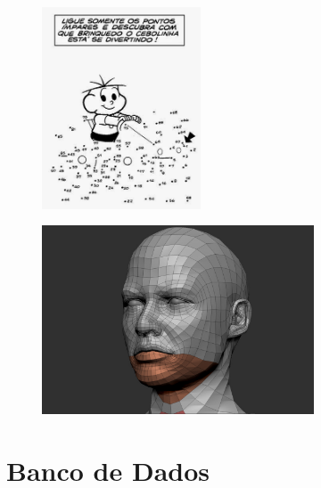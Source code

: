 	\begin{frame}
		\begin{figure}
			\centering
			\includegraphics[width=0.42\textwidth]{img/uso_1.jpg}
		\end{figure}
	\end{frame}
	
	\begin{frame}
		\begin{figure}
			\centering
			\includegraphics[width=0.72\textwidth]{img/uso_2.jpg}
		\end{figure}
	\end{frame}


\section{Banco de Dados}
